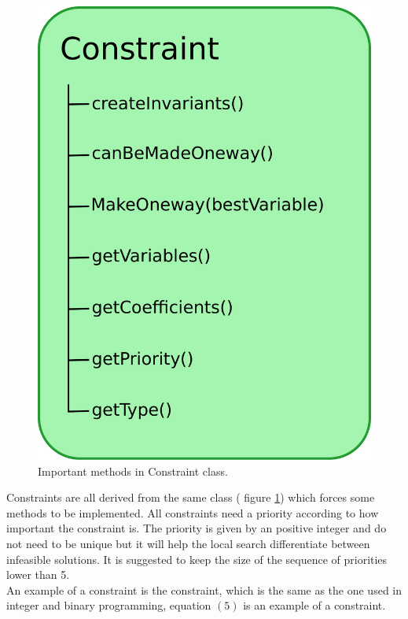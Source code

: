 \begin{figure}[!b]
\centering
\includegraphics[width=\linewidth/2]{constraint.pdf} \caption{Important methods in Constraint 
class.}\label{fig_constraint}
\end{figure}
Constraints are all derived from the same class ( figure \ref{fig_constraint}) which forces some 
methods to be implemented. All constraints need a priority according to how important the constraint is. The priority 
is given by an positive integer and do not need to be unique but it will help the local search differentiate between 
infeasible solutions. It is suggested to keep the size of the sequence of priorities lower than 5. \\
An example of a constraint is the  constraint, which is the same as the one used in integer and binary 
programming, equation $(5)$ is an example of a  constraint. 
